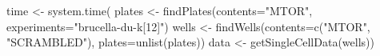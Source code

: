 

\begin{rflow}
time <- system.time({
  plates <- findPlates(contents="MTOR",
                       experiments="brucella-du-k[12]")
  wells  <- findWells(contents=c("MTOR", "SCRAMBLED"),
                      plates=unlist(plates))
  data   <- getSingleCellData(wells)})
\end{rflow}

\newcommand{\knitrScfFindGetDemoTime}{\SI{44}{\second}}
\newcommand{\knitrScfFindGetDemoSize}{\SI{1.22}{\giga\byte}}
\newcommand{\knitrScfFindGetDemoLengthW}{104}
\newcommand{\knitrScfFindGetDemoLengthP}{8}
